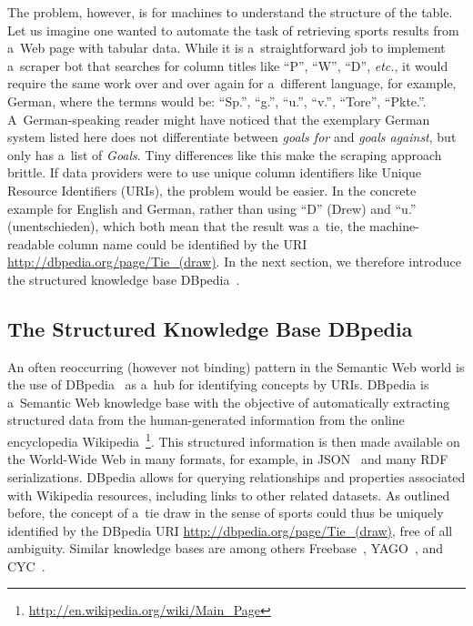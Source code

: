 The problem, however, is for machines to understand
the structure of the table.
Let us imagine one wanted to automate the task
of retrieving sports results from a~Web page with tabular data.
While it is a~straightforward job to implement
a~scraper bot that searches for column titles
like ``P'', ``W'', ``D'', \emph{etc.},
it would require the same work over and over again
for a~different language,
for example, German, where the termns would be:
``Sp.'', ``g.'', ``u.'', ``v.'', ``Tore'', ``Pkte.''.
A~German-speaking reader might have noticed
that the exemplary German system listed here
does not differentiate between \emph{goals for}
and \emph{goals against}, but only has a~list of \emph{Goals}.
Tiny differences like this make the scraping approach brittle.
If data providers were to use unique column identifiers like
Unique Resource Identifiers (URIs),
the problem would be easier.
In the concrete example for English and German,
rather than using ``D'' (Drew) and ``u.'' (unentschieden),
which both mean that the result was a~tie,
the machine-readable column name could be identified by the URI
\url{http://dbpedia.org/page/Tie_(draw)}.
In the next section, we therefore introduce
the structured knowledge base DBpedia~\cite{auer2007dbpedia}.

\subsection{The Structured Knowledge Base DBpedia}
An often reoccurring (however not binding) pattern
in the Semantic Web world
is the use of DBpedia~\cite{auer2007dbpedia}
as a~hub for identifying concepts by URIs.
DBpedia is a~Semantic Web knowledge base
with the objective of automatically extracting
structured data from the human-generated information
from the online encyclopedia
Wikipedia~\footnote{\url{http://en.wikipedia.org/wiki/Main_Page}}.
This structured information is then made available
on the World-Wide Web in many formats,
for example, in JSON~\cite{crockford2006json}
and many RDF~\cite{klyne2004rdf} serializations.
DBpedia allows for querying relationships
and properties associated with Wikipedia resources,
including links to other related datasets.
As outlined before, the concept of a~tie draw
in the sense of sports could thus be uniquely identified
by the DBpedia URI \url{http://dbpedia.org/page/Tie_(draw)},
free of all ambiguity.
Similar knowledge bases are among others
Freebase~\cite{markoff2007freebase},
YAGO~\cite{suchanek2007yago}, and CYC~\cite{lenat1995cyc}.

